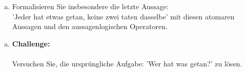 \begin{enumerate}[b), leftmargin=*]
    \item Formalisieren Sie insbesondere die letzte Aussage:\\'Jeder hat etwas getan, keine zwei taten dasselbe' mit diesen atomaren Aussagen und den aussagenlogischen Operatoren.
\end{enumerate}

\begin{enumerate}[c), leftmargin=*]
	\item \textbf{Challenge:}\\~\\
    	Versuchen Sie, die ursprüngliche Aufgabe: 'Wer hat was getan?' zu lösen.
\end{enumerate}